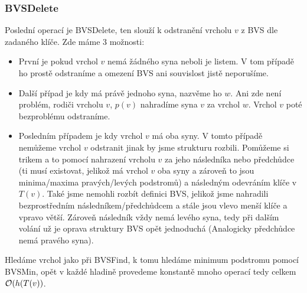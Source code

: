 \subsubsection{BVSDelete}

\noindent Poslední operací je BVSDelete, ten slouží k odstranění vrcholu $v$ z BVS dle zadaného klíče. Zde máme 3 možnosti:
\begin{itemize}
    \item První je pokud vrchol $v$ nemá žádného syna neboli je listem. V tom případě ho prostě odstraníme a omezení BVS ani souvislost jistě neporušíme.

    \item Další případ je kdy má právě jednoho syna, nazvěme ho $w$. Ani zde není problém, rodiči vrcholu $v$, $p(v)$ nahradíme syna $v$ za vrchol $w$. Vrchol $v$ poté bezproblému odstraníme.

    \item Posledním případem je kdy vrchol $v$ má oba syny. V tomto případě nemůžeme vrchol $v$ odstranit jinak by jsme strukturu rozbili. Pomůžeme si trikem a to pomocí nahrazení vrcholu $v$ za jeho následníka nebo předchůdce (ti musí existovat, jelikož má vrchol $v$ oba syny a zároveň to jsou minima/maxima pravých/levých podstromů) a následným odevráním klíče v $T(v)$. Také jsme nemohli rozbít definici BVS, jelikož jsme nahradili bezprostředním následníkem/předchůdcem a stále jsou vlevo menší klíče a vpravo větší. Zároveň následník vždy nemá levého syna, tedy při dalším volání už je oprava struktury BVS opět jednoduchá (Analogicky předchůdce nemá pravého syna).
\end{itemize}
Hledáme vrchol jako při BVSFind, k tomu hledáme minimum podstromu pomocí BVSMin, opět v každé hladině provedeme konstantě mnoho operací tedy celkem $\mathcal{O}(h(T(v))$. \bigskip

